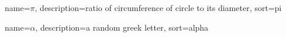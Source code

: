 {
  name={\ensuremath{\pi}},
  description={ratio of circumference of circle to its
               diameter},
  sort=pi
}

{
  name={\ensuremath{\alpha}},
  description={a random greek letter},
  sort=alpha
}
